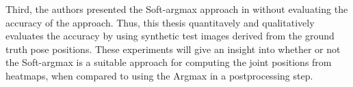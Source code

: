 Third, the authors presented the Soft-argmax approach in \cite{luvizon_human_2017} without evaluating the accuracy of the approach.
Thus, this thesis quantitavely and qualitatively evaluates the accuracy by using synthetic test images derived from the ground truth pose positions.
These experiments will give an insight into whether or not the Soft-argmax is a suitable approach for computing the joint positions from heatmaps, when compared to using the Argmax in a postprocessing step.


